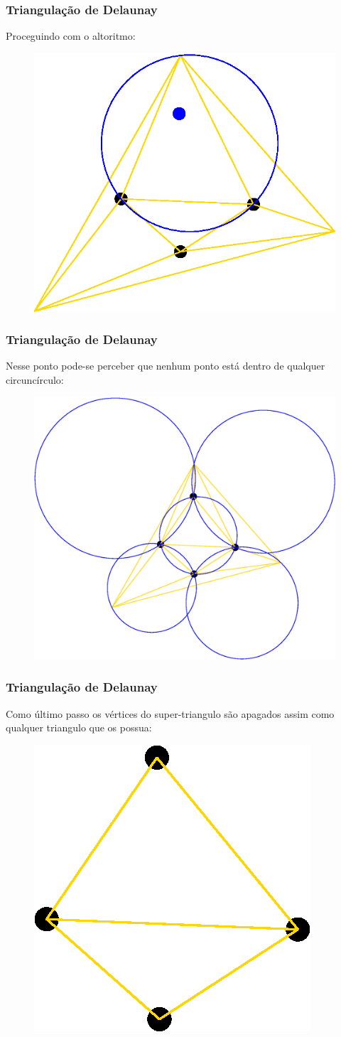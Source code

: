 \documentclass[brazil]{beamer}
\begin{document}
\begin{frame}
  \frametitle{Triangulação de Delaunay}
  Proceguindo com o altoritmo:

  \begin{figure}
    \includegraphics[width=0.5\linewidth]{dela12.eps}
  \end{figure}
\end{frame}

\begin{frame}
  \frametitle{Triangulação de Delaunay}
  Nesse ponto pode-se perceber que nenhum ponto está dentro de qualquer circuncírculo:

  \begin{figure}
    \includegraphics[width=0.8\linewidth]{dela13.eps}
  \end{figure}
\end{frame}

\begin{frame}
  \frametitle{Triangulação de Delaunay}
  Como último passo os vértices do super-triangulo são apagados assim como qualquer triangulo que os possua:

  \begin{figure}
    \includegraphics[width=0.3\linewidth]{dela14.eps}
  \end{figure}
\end{frame}
\end{document}

